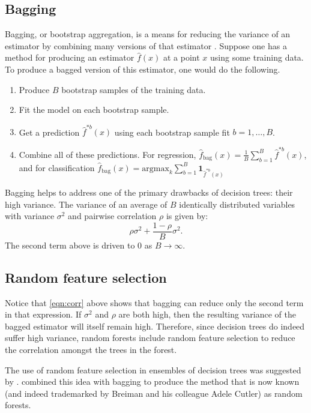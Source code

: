 \documentclass[10pt,a4paper]{article}
\begin{document}
\subsection{Bagging}
Bagging, or bootstrap aggregation, is a means for reducing the variance of an estimator by combining many versions of that estimator \citep{Breiman1996}. Suppose one has a method for producing an estimator $\hat f(x)$ at a point $x$ using some training data. To produce a bagged version of this estimator, one would do the following.
\begin{enumerate}
	\item Produce $B$ bootstrap samples of the training data.
	\item Fit the model on each bootstrap sample.
	\item Get a prediction $\hat f^{*b}(x)$  using each bootstrap sample fit $b=1,\ldots,B$.
	\item Combine all of these predictions. For regression, $\hat f_{\mathrm{bag}}(x)=\frac 1B \sum_{b=1}^B \hat f^{*b}(x)$, and for classification $\hat f_{\mathrm{bag}}(x) = \mathrm{argmax}_{k} \sum_{b=1}^B \mathbf1_{\hat f^{*b}(x)}$
\end{enumerate}

Bagging helps to address one of the primary drawbacks of decision trees: their high variance. The variance of an average of $B$ identically distributed variables with variance $\sigma^2$ and pairwise correlation $\rho$ is given by:
\begin{equation}\label{eqn:corr}
\rho \sigma^2 + \frac{1-\rho}B \sigma^2.
\end{equation}
The second term above is driven to 0 as $B\to\infty$.

\subsection{Random feature selection}
Notice that \eqref{eqn:corr} above shows that bagging can reduce only the second term in that expression. If $\sigma^2$ and $\rho$ are both high, then the resulting variance of the bagged estimator will itself remain high. Therefore, since decision trees do indeed suffer high variance, random forests include random feature selection to reduce the correlation amongst the trees in the forest.

The use of random feature selection in ensembles of decision trees was suggested by \citet{TinKamHo1995}. \citet{Breiman2001} combined this idea with bagging to produce the method that is now known (and indeed trademarked by Breiman and his colleague Adele Cutler) as random forests.
\end{document}
